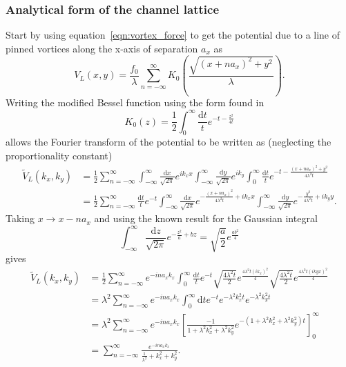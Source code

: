 \documentclass{article}
\numberwithin{equation}{section}
\begin{document}
\subsubsection{Analytical form of the channel lattice} \label{sec:analytic_chan}
Start by using equation~\ref{eqn:vortex_force} to get the potential due to a line of pinned vortices along the x-axis of separation $a_x$ as \cite{Watkins2016DensitySuperconductors}
\begin{equation}
    V_L(x, y) = \frac{f_0}{\lambda}\sum_{n=-\infty}^\infty K_0 \left( \frac{\sqrt{(x + na_x)^2 + y^2}}{\lambda} \right).
\end{equation}
Writing the modified Bessel function using the form found in \cite{I.S.Gradshteyn2015TableProducts}
\begin{equation}
    K_0(z) = \frac{1}{2}\int_0^\infty \frac{\mathrm{d}t}{t}e^{-t-\frac{z^2}{4t}}
\end{equation}
allows the Fourier transform of the potential to be written as (neglecting the proportionality constant)
\begin{align*}
    \tilde{V}_L(k_x, k_y) &= \frac{1}{2}\sum_{n=-\infty}^\infty \int_{-\infty}^\infty\frac{\mathrm{d}x}{\sqrt{2\pi}}e^{ik_xx} \int_{-\infty}^\infty\frac{\mathrm{d}y}{\sqrt{2\pi}}e^{ik_y} \int_0^\infty\frac{\mathrm{d}t}{t}e^{-t-\frac{(x+na_x)^2 + y^2}{4\lambda^2t}} \\
    &= \frac{1}{2}\sum_{n=-\infty}^\infty \frac{\mathrm{d}t}{t}e^{-t} \int_{-\infty}^\infty\frac{\mathrm{d}x}{\sqrt{2\pi}}e^{-\frac{(x+na_x)^2}{4\lambda^2t}+ik_xx}
    \int_{-\infty}^\infty\frac{\mathrm{d}y}{\sqrt{2\pi}}e^{-\frac{y^2}{4\lambda^2t}+ik_yy}.
\end{align*}
Taking $x \rightarrow x - na_x$ and using the known result for the Gaussian integral
\begin{equation}
    \int_{-\infty}^\infty\frac{\mathrm{d}z}{\sqrt{2\pi}}e^{-\frac{z^2}{a}+bz} = \sqrt{\frac{a}{2}}e^{\frac{ab^2}{4}}
\end{equation}
gives
\begin{align*}
    \tilde{V}_L(k_x, k_y) &= \frac{1}{2}\sum_{n=-\infty}^\infty e^{-ina_xk_x} \int_0^\infty\frac{\mathrm{d}t}{t}e^{-t} \sqrt{\frac{4\lambda^2t}{2}}e^{\frac{4\lambda^2t(ik_x)^2}{4}} \sqrt{\frac{4\lambda^2t}{2}}e^{\frac{4\lambda^2t(ikyx)^2}{4}} \\
    &= \lambda^2\sum_{n=-\infty}^\infty e^{-ina_xk_x} \int_0^\infty\mathrm{d}te^{-t}e^{-\lambda^2k_x^2t}e^{-\lambda^2k_y^2t} \\
    &= \lambda^2\sum_{n=-\infty}^\infty e^{-ina_xk_x} \left[\frac{-1}{1+\lambda^2k_x^2+\lambda^2k_y^2} e^{-\left(1+\lambda^2k_x^2+\lambda^2k_y^2\right)t}\right]_0^\infty\ \\
    &= \sum_{n=-\infty}^\infty \frac{e^{-ina_xk_x}}{\frac{1}{\lambda^2}+k_x^2+k_y^2}.
\end{align*}
\end{document}
